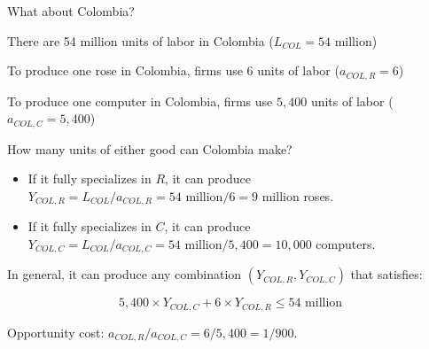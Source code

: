 \documentclass[notes,11pt, aspectratio=169, xcolor=table]{beamer}
\newenvironment{wideitemize}{\itemize\addtolength{\itemsep}{10pt}}{\enditemize}
\begin{document}
\begin{frame}{What about Colombia?}
\begin{wideitemize}
        \item There are 54 million units of labor in Colombia ($L_{COL} = 54$ million)
        \item To produce one rose in Colombia, firms use $6$ units of labor ($a_{COL,R} = 6$)
        \item To produce one computer in Colombia, firms use $5,400$ units of labor ($a_{COL,C} = 5,400$)
        \item How many units of either good can Colombia make?
        \begin{itemize}
            \item If it fully specializes in $R$, it can produce $Y_{COL,R}=L_{COL}/a_{COL,R} = 54 \text{ million}/6 = 9 \text{ million}$ roses.
            \item If it fully specializes in $C$, it can produce $Y_{COL,C}=L_{COL}/a_{COL,C} = 54 \text{ million}/5,400 = 10,000$ computers.
        \end{itemize}

        \item In general, it can produce any combination $(Y_{COL,R}, Y_{COL,C})$ that satisfies:

        \begin{equation*}
            5,400 \times Y_{COL,C} + 6 \times Y_{COL,R} \le 54 \text{ million}
        \end{equation*}
        \item Opportunity cost: $a_{COL,R} / a_{COL,C} = 6 / 5,400 = 1/900$.
    \end{wideitemize}
\end{frame}
\end{document}
